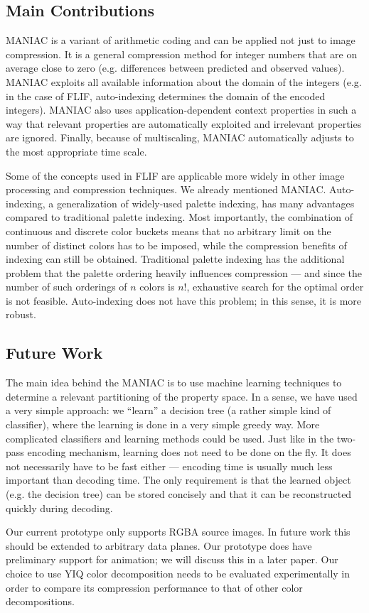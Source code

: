 \documentclass[a4paper,USenglish]{lipics}
\begin{document}
\subsection{Main Contributions}

MANIAC is a variant of arithmetic coding and can be applied not just to image compression. It is a general compression
method for integer numbers that are on average close to zero (e.g. differences between predicted and observed values).
MANIAC exploits all available information about the domain of the integers (e.g. in the case of FLIF, auto-indexing determines
the domain of the encoded integers). MANIAC also uses application-dependent context properties in such a way that
relevant properties are automatically exploited and irrelevant properties are ignored. Finally, because of
multiscaling, MANIAC automatically adjusts to the most appropriate time scale.

Some of the concepts used in FLIF are applicable more widely in other image processing and compression techniques.
We already mentioned MANIAC. Auto-indexing, a generalization of widely-used palette indexing, has many advantages compared
to traditional palette indexing. Most importantly, the combination of continuous and discrete color buckets means that no
arbitrary limit on the number of distinct colors has to be imposed, while the compression benefits of indexing can still be obtained.
Traditional palette indexing has the additional problem that the palette ordering heavily influences compression --- and since
the number of such orderings of $n$ colors is $n!$, exhaustive search for the optimal order is not feasible.
Auto-indexing does not have this problem; in this sense, it is more robust.




\subsection{Future Work}

The main idea behind the MANIAC is to use machine learning techniques to determine a relevant partitioning of the property space.
In a sense, we have used a very simple approach: we ``learn'' a decision tree (a rather simple kind of classifier),
where the learning is done in a very simple greedy way. More complicated classifiers and learning methods could be used.
Just like in the two-pass encoding mechanism,
learning does not need to be done on the fly. It does not necessarily have to be fast either --- encoding time is usually much less important
than decoding time. The only requirement is that the learned object (e.g. the decision tree) can be stored concisely and
that it can be reconstructed quickly during decoding.

Our current prototype only supports RGBA source images. In future work this should be extended to arbitrary data planes.
Our prototype does have preliminary support for animation; we will discuss this in a later paper.
Our choice to use YIQ color decomposition needs to be evaluated experimentally in order to
compare its compression performance to that of other color decompositions.





\end{document}
